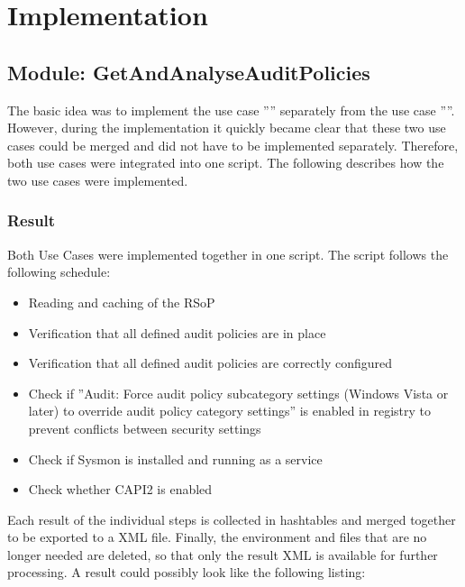 \section{Implementation}

\subsection{Module: GetAndAnalyseAuditPolicies}
The basic idea was to implement the use case '''' separately from the use case ''''. However, during the implementation it quickly became clear that these two use cases could be merged and did not have to be implemented separately. Therefore, both use cases were integrated into one script. The following describes how the two use cases were implemented.

\subsubsection{Result}\label{GetAndAnalyseAuditPoliciesResult}
Both Use Cases were implemented together in one script. The script follows the following schedule:
\begin{itemize}
    \item Reading and caching of the RSoP
    \item Verification that all defined audit policies are in place
    \item Verification that all defined audit policies are correctly configured
    \item Check if ''Audit: Force audit policy subcategory settings (Windows Vista or later) to override audit policy category settings'' is enabled in registry to prevent conflicts between security settings
    \item Check if Sysmon is installed and running as a service
    \item Check whether CAPI2 is enabled
\end{itemize}
Each result of the individual steps is collected in hashtables and merged together to be exported to a XML file. Finally, the environment and files that are no longer needed are deleted, so that only the result XML is available for further processing. A result could possibly look like the following listing:
